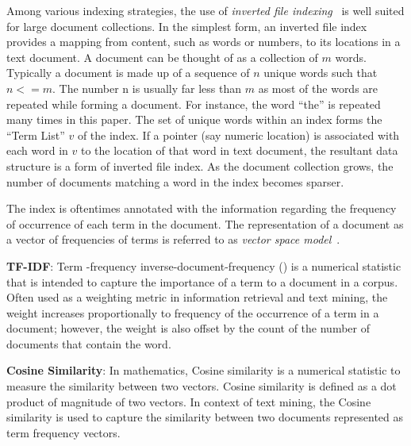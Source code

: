 Among various indexing strategies,
the use of \textit{inverted file indexing}~\cite{frakes1992introduction}
is well suited for large document collections.
In the simplest form, an inverted file index provides
a mapping from content, such as words or numbers, to its locations in a text document.
A document can be thought of as a collection of $m$ words.
Typically a document is made up of a sequence of $n$ unique words
such that $n <= m$.
The number n is usually far less than
$m$ as most of the words are repeated while forming a document. 
For instance, the word ``the'' is repeated many times in this paper.
The set of unique words within an index forms
the ``Term List'' $v$ of the index.
If a pointer (say numeric location) is associated with each word in $v$ to the location
of that word in text document, the resultant data structure
is a form of inverted file index.
As the document collection grows,
the number of documents matching a word in the index becomes sparser.

The index is oftentimes annotated with the information regarding 
the frequency of occurrence of each term in the document. 
The representation of a document as a vector of frequencies
of terms is referred to as \textit{vector space model}~\cite{singhal2001modern,frakes1992introduction}.

\textbf{TF-IDF}\cite{manning2008introduction}:
Term -frequency inverse-document-frequency () is a numerical statistic that is intended to capture the importance of a term to a document in a corpus.
Often used as a weighting metric in information retrieval and text mining,
the  weight increases proportionally to frequency of the occurrence of a term in a document; however, the weight is also offset by the count of the number of documents that contain the word.

\textbf{Cosine Similarity}\cite{singhal2001modern}: In mathematics, Cosine similarity is a numerical statistic to measure the similarity between two vectors.
Cosine similarity is defined as a dot product of magnitude of two vectors.
In context of text mining, the Cosine similarity is used to capture the similarity between two documents represented as term frequency vectors.

